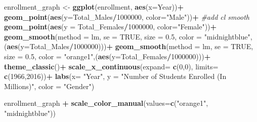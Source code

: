 \documentclass[]{article}
\newenvironment{Shaded}{\begin{snugshade}}{\end{snugshade}}
\newcommand{\KeywordTok}[1]{\textcolor[rgb]{0.13,0.29,0.53}{\textbf{#1}}}
\newcommand{\DataTypeTok}[1]{\textcolor[rgb]{0.13,0.29,0.53}{#1}}
\newcommand{\DecValTok}[1]{\textcolor[rgb]{0.00,0.00,0.81}{#1}}
\newcommand{\FloatTok}[1]{\textcolor[rgb]{0.00,0.00,0.81}{#1}}
\newcommand{\StringTok}[1]{\textcolor[rgb]{0.31,0.60,0.02}{#1}}
\newcommand{\CommentTok}[1]{\textcolor[rgb]{0.56,0.35,0.01}{\textit{#1}}}
\newcommand{\OtherTok}[1]{\textcolor[rgb]{0.56,0.35,0.01}{#1}}
\newcommand{\OperatorTok}[1]{\textcolor[rgb]{0.81,0.36,0.00}{\textbf{#1}}}
\newcommand{\NormalTok}[1]{#1}
\begin{document}
\begin{Shaded}
\begin{Highlighting}[]
\NormalTok{enrollment_graph <-}\StringTok{ }\KeywordTok{ggplot}\NormalTok{(enrollment, }\KeywordTok{aes}\NormalTok{(}\DataTypeTok{x=}\NormalTok{Year))}\OperatorTok{+}
\StringTok{  }\KeywordTok{geom_point}\NormalTok{(}\KeywordTok{aes}\NormalTok{(}\DataTypeTok{y=}\NormalTok{Total_Males}\OperatorTok{/}\DecValTok{1000000}\NormalTok{, }\DataTypeTok{color=}\StringTok{"Male"}\NormalTok{))}\OperatorTok{+}\StringTok{ }\CommentTok{#add cl smooth}
\StringTok{  }\KeywordTok{geom_point}\NormalTok{(}\KeywordTok{aes}\NormalTok{(}\DataTypeTok{y =}\NormalTok{ Total_Females}\OperatorTok{/}\DecValTok{1000000}\NormalTok{, }\DataTypeTok{color=}\StringTok{"Female"}\NormalTok{))}\OperatorTok{+}
\StringTok{  }\KeywordTok{geom_smooth}\NormalTok{(}\DataTypeTok{method =}\NormalTok{ lm, }\DataTypeTok{se =} \OtherTok{TRUE}\NormalTok{, }\DataTypeTok{size =} \FloatTok{0.5}\NormalTok{, }\DataTypeTok{color =} \StringTok{"midnightblue"}\NormalTok{,(}\KeywordTok{aes}\NormalTok{(}\DataTypeTok{y=}\NormalTok{Total_Males}\OperatorTok{/}\DecValTok{1000000}\NormalTok{)))}\OperatorTok{+}
\StringTok{  }\KeywordTok{geom_smooth}\NormalTok{(}\DataTypeTok{method =}\NormalTok{ lm, }\DataTypeTok{se =} \OtherTok{TRUE}\NormalTok{, }\DataTypeTok{size =} \FloatTok{0.5}\NormalTok{, }\DataTypeTok{color =} \StringTok{"orange1"}\NormalTok{,(}\KeywordTok{aes}\NormalTok{(}\DataTypeTok{y=}\NormalTok{Total_Females}\OperatorTok{/}\DecValTok{1000000}\NormalTok{)))}\OperatorTok{+}
\StringTok{  }\KeywordTok{theme_classic}\NormalTok{()}\OperatorTok{+}
\StringTok{  }\KeywordTok{scale_x_continuous}\NormalTok{(}\DataTypeTok{expand=} \KeywordTok{c}\NormalTok{(}\DecValTok{0}\NormalTok{,}\DecValTok{0}\NormalTok{), }\DataTypeTok{limits=} \KeywordTok{c}\NormalTok{(}\DecValTok{1966}\NormalTok{,}\DecValTok{2016}\NormalTok{))}\OperatorTok{+}
\StringTok{  }\KeywordTok{labs}\NormalTok{(}\DataTypeTok{x=} \StringTok{"Year"}\NormalTok{, }\DataTypeTok{y =} \StringTok{"Number of Students Enrolled (In Millions)"}\NormalTok{, }\DataTypeTok{color =} \StringTok{"Gender"}\NormalTok{)}

\NormalTok{enrollment_graph }\OperatorTok{+}\StringTok{ }\KeywordTok{scale_color_manual}\NormalTok{(}\DataTypeTok{values=}\KeywordTok{c}\NormalTok{(}\StringTok{"orange1"}\NormalTok{, }\StringTok{"midnightblue"}\NormalTok{))}
\end{Highlighting}
\end{Shaded}
\end{document}

